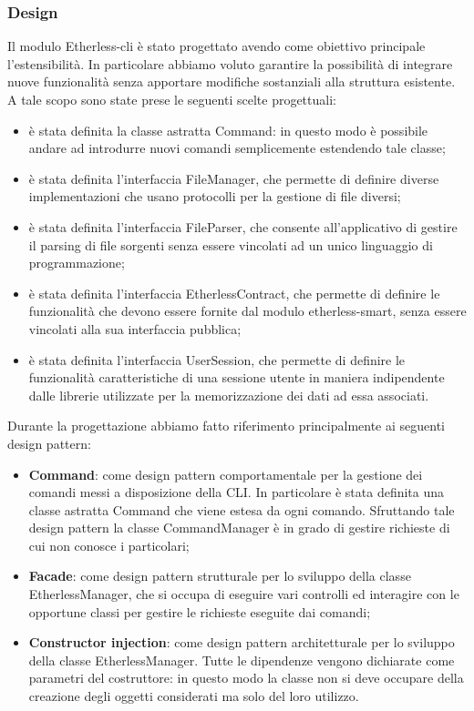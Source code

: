 \subsubsection{Design}
Il modulo Etherless-cli è stato progettato avendo come obiettivo principale l'estensibilità. In particolare abbiamo voluto garantire la possibilità di integrare nuove funzionalità senza apportare modifiche sostanziali alla struttura esistente. A tale scopo sono state prese le seguenti scelte progettuali:
\begin{itemize}
	\item è stata definita la classe astratta Command: in questo modo è possibile andare ad introdurre nuovi comandi semplicemente estendendo tale classe;
	\item è stata definita l'interfaccia FileManager, che permette di definire diverse implementazioni che usano protocolli per la gestione di file diversi;
	\item è stata definita l'interfaccia FileParser, che consente all'applicativo di gestire il parsing di file sorgenti senza essere vincolati ad un unico linguaggio di programmazione;
	\item è stata definita l'interfaccia EtherlessContract, che permette di definire le funzionalità che devono essere fornite dal modulo etherless-smart, senza essere vincolati alla sua interfaccia pubblica;
	\item è stata definita l'interfaccia UserSession, che permette di definire le funzionalità caratteristiche di una sessione utente in maniera indipendente dalle librerie utilizzate per la memorizzazione dei dati ad essa associati.
\end{itemize}

Durante la progettazione abbiamo fatto riferimento principalmente ai seguenti design pattern:
\begin{itemize}
	\item \textbf{Command}: come design pattern comportamentale per la gestione dei comandi messi a disposizione della CLI. In particolare è stata definita una classe astratta Command che viene estesa da ogni comando. Sfruttando tale design pattern la classe CommandManager è in grado di gestire richieste di cui non conosce i particolari;

	\item \textbf{Facade}: come design pattern strutturale per lo sviluppo della classe EtherlessManager, che si occupa di eseguire vari controlli ed interagire con le opportune classi per gestire le richieste eseguite dai comandi;

	\item \textbf{Constructor injection}: come design pattern architetturale per lo sviluppo della classe EtherlessManager. Tutte le dipendenze vengono dichiarate come parametri del costruttore: in questo modo la classe non si deve occupare della creazione degli oggetti considerati ma solo del loro utilizzo.
\end{itemize}


